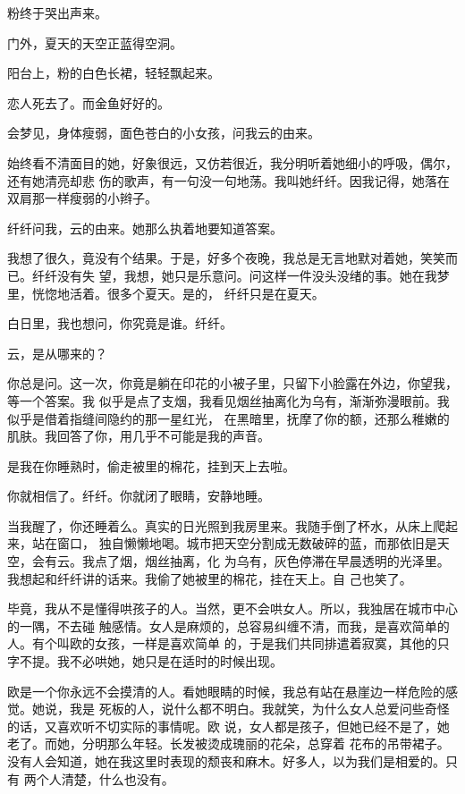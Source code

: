 		粉终于哭出声来。

		门外，夏天的天空正蓝得空洞。

		阳台上，粉的白色长裙，轻轻飘起来。

		恋人死去了。而金鱼好好的。

	\endwriting



		会梦见，身体瘦弱，面色苍白的小女孩，问我云的由来。


		始终看不清面目的她，好象很远，又仿若很近，我分明听着她细小的呼吸，偶尔，还有她清亮却悲
	伤的歌声，有一句没一句地荡。我叫她纤纤。因我记得，她落在双肩那一样瘦弱的小辫子。

		纤纤问我，云的由来。她那么执着地要知道答案。

		我想了很久，竟没有个结果。于是，好多个夜晚，我总是无言地默对着她，笑笑而已。纤纤没有失
	望，我想，她只是乐意问。问这样一件没头没绪的事。她在我梦里，恍惚地活着。很多个夏天。是的，
	纤纤只是在夏天。

		白日里，我也想问，你究竟是谁。纤纤。

		云，是从哪来的？

		你总是问。这一次，你竟是躺在印花的小被子里，只留下小脸露在外边，你望我，等一个答案。我
	似乎是点了支烟，我看见烟丝抽离化为乌有，渐渐弥漫眼前。我似乎是借着指缝间隐约的那一星红光，
	在黑暗里，抚摩了你的额，还那么稚嫩的肌肤。我回答了你，用几乎不可能是我的声音。

		是我在你睡熟时，偷走被里的棉花，挂到天上去啦。

		你就相信了。纤纤。你就闭了眼睛，安静地睡。

		当我醒了，你还睡着么。真实的日光照到我房里来。我随手倒了杯水，从床上爬起来，站在窗口，
	独自懒懒地喝。城市把天空分割成无数破碎的蓝，而那依旧是天空，会有云。我点了烟，烟丝抽离，化
	为乌有，灰色停滞在早晨透明的光泽里。我想起和纤纤讲的话来。我偷了她被里的棉花，挂在天上。自
	己也笑了。

		毕竟，我从不是懂得哄孩子的人。当然，更不会哄女人。所以，我独居在城市中心的一隅，不去碰
	触感情。女人是麻烦的，总容易纠缠不清，而我，是喜欢简单的人。有个叫欧的女孩，一样是喜欢简单
	的，于是我们共同排遣着寂寞，其他的只字不提。我不必哄她，她只是在适时的时候出现。


		欧是一个你永远不会摸清的人。看她眼睛的时候，我总有站在悬崖边一样危险的感觉。她说，我是
	死板的人，说什么都不明白。我就笑，为什么女人总爱问些奇怪的话，又喜欢听不切实际的事情呢。欧
	说，女人都是孩子，但她已经不是了，她老了。而她，分明那么年轻。长发被烫成瑰丽的花朵，总穿着
	花布的吊带裙子。没有人会知道，她在我这里时表现的颓丧和麻木。好多人，以为我们是相爱的。只有
	两个人清楚，什么也没有。

